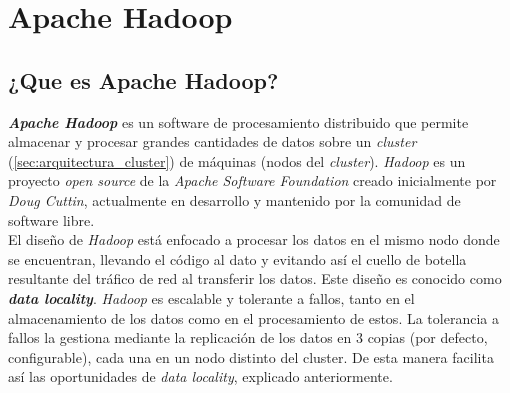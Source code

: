 
\chapter{Apache\textsuperscript{\footnotesize\texttrademark} Hadoop\textsuperscript{\footnotesize\textregistered}}
\section{¿Que es Apache Hadoop?}\label{sec:que_es_apache_hadoop}
\textbf{\textit{Apache Hadoop}} es un software de procesamiento distribuido que permite almacenar 
y procesar grandes cantidades de datos sobre un \textit{cluster} (\autoref{sec:arquitectura_cluster})
 de máquinas (nodos del \textit{cluster}).
\textit{Hadoop} es un proyecto \textit{open source} de la \textit{Apache Software Foundation} creado inicialmente por
\textit{Doug Cuttin}, actualmente en desarrollo y mantenido por la comunidad de software libre.\\
El diseño de \textit{Hadoop} está enfocado a procesar los datos en el mismo nodo donde se encuentran,
llevando el código al dato y evitando así el cuello de botella resultante del tráfico de red
al transferir los datos. Este diseño es conocido como \textit{\textbf{data locality}}.
\textit{Hadoop} es escalable y tolerante a fallos, tanto en el almacenamiento de los datos como en el
procesamiento de estos. La tolerancia a fallos la gestiona mediante la replicación de los datos
en 3 copias (por defecto, configurable), cada una en un nodo distinto del cluster. 
De esta manera facilita así las oportunidades de \textit{data locality}, explicado anteriormente.

